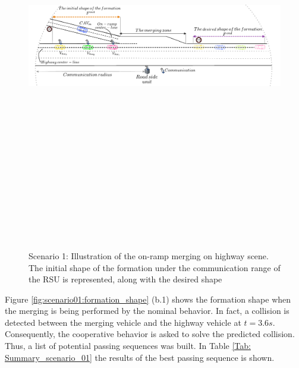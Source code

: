      \begin{figure}[!h]
        \centering 
        \includegraphics[width=13cm,height=18cm,keepaspectratio]{chapters/Chapitre_6/Figures/Scenario_1/Scenario_scene.pdf}
        \caption{Scenario 1: Illustration of the on-ramp merging on highway scene. The initial shape of the formation under the communication range of the RSU is represented, along with the desired shape }
        \label{fig:scenario01:scenario_scene}
        \end{figure}


Figure \ref{fig:scenario01:formation_shape} (b.1) shows the formation shape when the merging is being performed by the nominal behavior. In fact, a collision is detected between the merging vehicle and the highway vehicle at $t=3.6s$. Consequently, the cooperative behavior is asked to solve the predicted collision. Thus, a list of potential passing sequences was built. In Table \ref{Tab: Summary_scenario_01}  the results of the best passing sequence is shown. 



